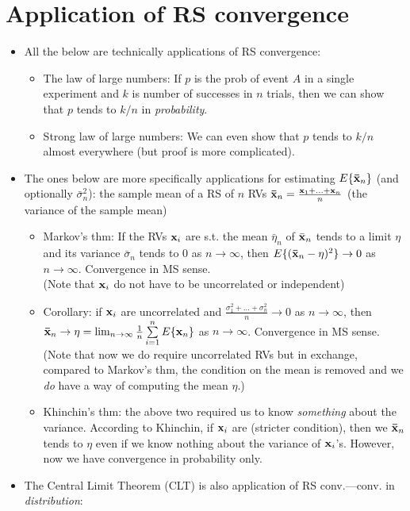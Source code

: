 \documentclass[a4paper, oneside]{book}
\begin{document}
\section{Application of RS convergence}
\begin{itemize}
\item All the below are technically applications of RS convergence:
	\begin{itemize}
	\item The law of large numbers: If $p$ is the prob of event $A$ in a single experiment and $k$ is number of successes in $n$ trials, then we can show that $p$ tends to $k/n$ in \textit{probability}.
	\item Strong law of large numbers: We can even show that $p$ tends to $k/n$ almost everywhere (but proof is more complicated).
	\end{itemize}
	\item The ones below are more specifically applications for estimating $E\{\mathbf{\bar{x}}_n\}$ (and optionally $\bar{\sigma}^2_n$): the sample mean of a RS of $n$ RVs $\mathbf{\bar{x}}_n=\frac{\mathbf{x}_1+\hdots+\mathbf{x}_n}{n}$ (the variance of the sample mean)
	\begin{itemize}
	\item Markov's thm: If the RVs $\mathbf{x}_i$ are s.t. the mean $\bar{\eta}_n$ of $\bar{\mathbf{x}}_n$ tends to a limit $\eta$ and its variance $\bar{\sigma}_n$ tends to $0$ as $n\to \infty$, then $E\{(\mathbf{\bar{x}}_n-\eta)^2\}\to 0$ as $n\to \infty$. Convergence in MS sense.\\
	(Note that $\mathbf{x}_i$ do not have to be uncorrelated or independent)
	\item Corollary: if $\mathbf{x}_i$ are uncorrelated and $\frac{\sigma_1^2+\hdots+\sigma_n^2}{n}\to 0$ as $n\to \infty$, then $\mathbf{\bar{x}}_n\to \eta=\lim_{n\to\infty} \frac{1}{n}\sum\limits_{i=1}^n E\{\mathbf{x}_n\}$ as $n\to \infty$. Convergence in MS sense. \\
	(Note that now we do require uncorrelated RVs but in exchange, compared to Markov's thm, the condition on the mean is removed and we \textit{do} have a way of computing the mean $\eta$.)
	\item Khinchin's thm: the above two required us to know \textit{something} about the variance. According to Khinchin, if $\mathbf{x}_i$ are \iid (stricter condition), then we $\mathbf{\bar{x}}_n$ tends to $\eta$ even if we know nothing about the variance of $\mathbf{x}_i$'s. However, now we have convergence in probability only.
	\end{itemize}
\item The Central Limit Theorem (CLT) is also application of RS conv.\----conv. in \textit{distribution}:

\end{itemize}
\end{document}
